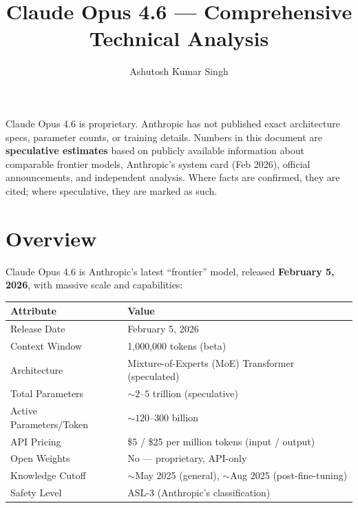 \documentclass[11pt,a4paper]{article}
\title{\textbf{Claude Opus 4.6 --- Comprehensive Technical Analysis}}
\author{Ashutosh Kumar Singh}
\date{}
\begin{document}
\maketitle
\thispagestyle{fancy}

\begin{tcolorbox}[colback=yellow!10, colframe=yellow!50!black, title=Disclaimer]
Claude Opus 4.6 is proprietary. Anthropic has not published exact architecture specs, parameter counts, or training details. Numbers in this document are \textbf{speculative estimates} based on publicly available information about comparable frontier models, Anthropic's system card (Feb 2026), official announcements, and independent analysis. Where facts are confirmed, they are cited; where speculative, they are marked as such.
\end{tcolorbox}

\tableofcontents
\newpage

\section{Overview}

Claude Opus 4.6 is Anthropic's latest ``frontier'' model, released \textbf{February 5, 2026}, with massive scale and capabilities:

\begin{center}
\begin{tabular}{ll}
\toprule
\textbf{Attribute} & \textbf{Value} \\
\midrule
Release Date & February 5, 2026 \\
Context Window & 1,000,000 tokens (beta) \\
Architecture & Mixture-of-Experts (MoE) Transformer (speculated) \\
Total Parameters & $\sim 2\text{--}5$ trillion (speculative) \\
Active Parameters/Token & $\sim 120\text{--}300$ billion \\
API Pricing & \$5 / \$25 per million tokens (input / output) \\
Open Weights & No --- proprietary, API-only \\
Knowledge Cutoff & $\sim$May 2025 (general), $\sim$Aug 2025 (post-fine-tuning) \\
Safety Level & ASL-3 (Anthropic's classification) \\
\bottomrule
\end{tabular}
\end{center}
\end{document}
